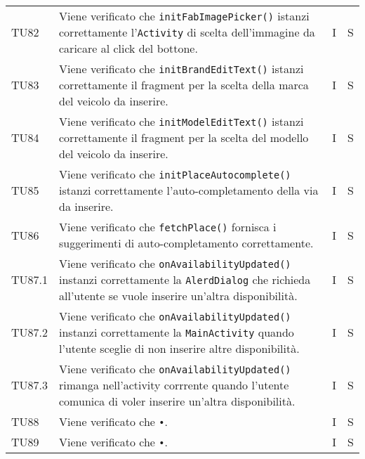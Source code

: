 \begin{longtable}{ >{\centering}p{}  >{\centering}p{} >{\centering}p{}
			>{\centering}p{}}
		\tabularnewline	
		TU82 & Viene verificato che \texttt{initFabImagePicker()} istanzi correttamente l'\texttt{Activity} di scelta dell'immagine da caricare al click del bottone. & I & S
		\tabularnewline	
		TU83 & Viene verificato che \texttt{initBrandEditText()} istanzi correttamente il fragment per la scelta della marca del veicolo da inserire. & I & S
		\tabularnewline	
		TU84 & Viene verificato che \texttt{initModelEditText()} istanzi correttamente il fragment per la scelta del modello del veicolo da inserire. & I & S
		\tabularnewline	
		TU85 & Viene verificato che \texttt{initPlaceAutocomplete()} istanzi correttamente l'auto-completamento della via da inserire. & I & S
		\tabularnewline	
		TU86 & Viene verificato che \texttt{fetchPlace()} fornisca i suggerimenti di auto-completamento correttamente. & I & S
		\tabularnewline	
		TU87.1 & Viene verificato che \texttt{onAvailabilityUpdated()} instanzi correttamente la \texttt{AlerdDialog} che richieda all'utente se vuole inserire un'altra disponibilità. & I & S
		\tabularnewline	
		TU87.2 & Viene verificato che \texttt{onAvailabilityUpdated()} instanzi correttamente la \texttt{MainActivity} quando l'utente sceglie di non inserire altre disponibilità. & I & S
		\tabularnewline	
		TU87.3 & Viene verificato che \texttt{onAvailabilityUpdated()} rimanga nell'activity corrrente quando l'utente comunica di voler inserire un'altra disponibilità. & I & S
		\tabularnewline	
		TU88 & Viene verificato che \texttt{•}. & I & S
		\tabularnewline	
		TU89 & Viene verificato che \texttt{•}. & I & S
		
		
		\end{longtable}